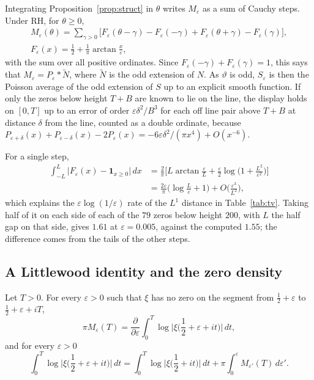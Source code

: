 Integrating Proposition~\ref{prop:struct} in $\theta$ writes $M_\varepsilon$ as a sum of Cauchy steps. Under RH, for $\theta\ge0$,
\begin{gather*}
M_\varepsilon(\theta)=\sum_{\gamma>0}\big[F_\varepsilon(\theta-\gamma)-F_\varepsilon(-\gamma)+F_\varepsilon(\theta+\gamma)-F_\varepsilon(\gamma)\big],\\
F_\varepsilon(x)=\frac12+\frac1\pi\arctan\frac x\varepsilon ,
\end{gather*}
with the sum over all positive ordinates. Since $F_\varepsilon(-\gamma)+F_\varepsilon(\gamma)=1$, this says that $M_\varepsilon=P_\varepsilon*\tilde N$, where $\tilde N$ is the odd extension of $N$. As $\vartheta$ is odd, $S_\varepsilon$ is then the Poisson average of the odd extension of $S$ up to an explicit smooth function. If only the zeros below height $T+B$ are known to lie on the line, the display holds on $[0,T]$ up to an error of order $\varepsilon\delta^2/B^3$ for each off line pair above $T+B$ at distance $\delta$ from the line, counted as a double ordinate, because $P_{\varepsilon+\delta}(x)+P_{\varepsilon-\delta}(x)-2P_\varepsilon(x)=-6\varepsilon\delta^2/(\pi x^4)+O(x^{-6})$.

For a single step,
\begin{align*}
\int_{-L}^{L}\big|F_\varepsilon(x)-\mathbf 1_{x\ge0}\big|\,dx&=\frac2\pi\Big[L\arctan\frac\varepsilon L+\frac\varepsilon2\log\Big(1+\frac{L^2}{\varepsilon^2}\Big)\Big]\\
&=\frac{2\varepsilon}\pi\Big(\log\frac L\varepsilon+1\Big)+O\Big(\frac{\varepsilon^3}{L^2}\Big),
\end{align*}
which explains the $\varepsilon\log(1/\varepsilon)$ rate of the $L^1$ distance in Table~\ref{tab:tv}. Taking half of it on each side of each of the $79$ zeros below height $200$, with $L$ the half gap on that side, gives $1.61$ at $\varepsilon=0.005$, against the computed $1.55$; the difference comes from the tails of the other steps.

\subsection{A Littlewood identity and the zero density}\label{sec:ch9:density}

\begin{proposition}\label{prop:littlewood}
Let $T>0$. For every $\varepsilon>0$ such that $\xi$ has no zero on the segment from $\tfrac12+\varepsilon$ to $\tfrac12+\varepsilon+iT$,
\[
\pi M_\varepsilon(T)=\frac{\partial}{\partial\varepsilon}\int_0^T\log\Big|\xi\Big(\frac12+\varepsilon+it\Big)\Big|\,dt,
\]
and for every $\varepsilon>0$
\[
\int_0^T\log\Big|\xi\Big(\frac12+\varepsilon+it\Big)\Big|\,dt=\int_0^T\log\Big|\xi\Big(\frac12+it\Big)\Big|\,dt+\pi\int_0^\varepsilon M_{\varepsilon'}(T)\,d\varepsilon' .
\]
\end{proposition}

